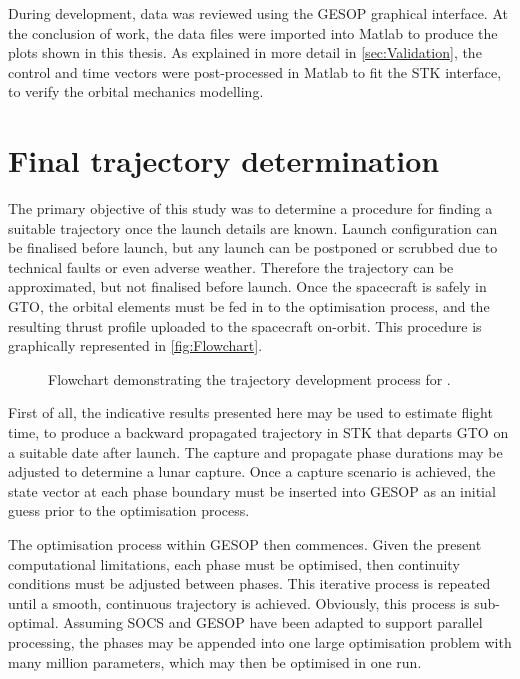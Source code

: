 During development, data was reviewed using the GESOP graphical interface. At the conclusion of work, the data files were imported into Matlab to produce the plots shown in this thesis. As explained in more detail in \autoref{sec:Validation}, the control and time vectors were post-processed in Matlab to fit the STK interface, to verify the orbital mechanics modelling.



\section{Final trajectory determination} \label{sec:Method-application}

The primary objective of this study was to determine a procedure for finding a suitable trajectory once the launch details are known. Launch configuration can be finalised before launch, but any launch can be postponed or scrubbed due to technical faults or even adverse weather. Therefore the trajectory can be approximated, but not finalised before launch. Once the spacecraft is safely in GTO, the orbital elements must be fed in to the optimisation process, and the resulting thrust profile uploaded to the spacecraft on-orbit. This procedure is graphically represented in \autoref{fig:Flowchart}.

\begin{figure}
\centering
\def\svgwidth{0.6\textwidth}

\caption{Flowchart demonstrating the trajectory development process for \BW.} \label{fig:Flowchart}
\end{figure}

First of all, the indicative results presented here may be used to estimate flight time, to produce a backward propagated trajectory in STK that departs GTO on a suitable date after launch. The capture and propagate phase durations may be adjusted to determine a lunar capture. Once a capture scenario is achieved, the state vector at each phase boundary must be inserted into GESOP as an initial guess prior to the optimisation process. 

The optimisation process within GESOP then commences. Given the present computational limitations, each phase must be optimised, then continuity conditions must be adjusted between phases. This iterative process is repeated until a smooth, continuous trajectory is achieved. Obviously, this process is sub-optimal. Assuming SOCS and GESOP have been adapted to support parallel processing, the phases may be appended into one large optimisation problem with many million parameters, which may then be optimised in one run.

